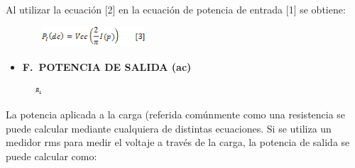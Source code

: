 \documentclass[12pt]{article}
\begin{document}

\par

Al utilizar la ecuación [2] en la ecuación de potencia de entrada [1] se obtiene:\par




\begin{figure}[H]
	\begin{Center}
		\includegraphics[width=1.74in,height=0.3in]{./media/image19.gif}
	\end{Center}
\end{figure}



\par

\begin{itemize}
	\item \textbf{F. POTENCIA DE SALIDA (ac)}
\end{itemize}\par




\begin{figure}[H]
	\begin{Center}
		\includegraphics[width=0.14in,height=0.12in]{./media/image20.gif}
	\end{Center}
\end{figure}



La potencia aplicada a la carga (referida comúnmente como una resistencia se puede calcular mediante cualquiera de distintas ecuaciones. Si se utiliza un medidor rms para medir el voltaje a través de la carga, la potencia de salida se puede calcular como:\par



\end{document}
